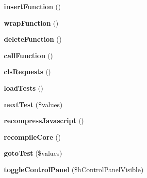 \begin{DoxyCompactItemize}
\item 
\hypertarget{classclsRequests_aefe0f19e2defb6061e760234f1917ba5}{
{\bfseries insertFunction} ()}
\label{classclsRequests_aefe0f19e2defb6061e760234f1917ba5}

\item 
\hypertarget{classclsRequests_afabd1b7dba58f75895e8fb9b5a83bf74}{
{\bfseries wrapFunction} ()}
\label{classclsRequests_afabd1b7dba58f75895e8fb9b5a83bf74}

\item 
\hypertarget{classclsRequests_ae243937177255fa0de65c9c7eba72335}{
{\bfseries deleteFunction} ()}
\label{classclsRequests_ae243937177255fa0de65c9c7eba72335}

\item 
\hypertarget{classclsRequests_a431c043ef017a22eadfe3abf18c07098}{
{\bfseries callFunction} ()}
\label{classclsRequests_a431c043ef017a22eadfe3abf18c07098}

\item 
\hypertarget{classclsRequests_abf00e5456c1624acca683a3f1584bd13}{
{\bfseries clsRequests} ()}
\label{classclsRequests_abf00e5456c1624acca683a3f1584bd13}

\item 
\hypertarget{classclsRequests_a92f4abbd473ee95778cf87dc901e8b67}{
{\bfseries loadTests} ()}
\label{classclsRequests_a92f4abbd473ee95778cf87dc901e8b67}

\item 
\hypertarget{classclsRequests_a80f55b2c0599bafb3e89c34ae862e1a2}{
{\bfseries nextTest} (\$values)}
\label{classclsRequests_a80f55b2c0599bafb3e89c34ae862e1a2}

\item 
\hypertarget{classclsRequests_acaa084d94af99c1e3bfffaef1d17bf3d}{
{\bfseries recompressJavascript} ()}
\label{classclsRequests_acaa084d94af99c1e3bfffaef1d17bf3d}

\item 
\hypertarget{classclsRequests_ac4fb35429664d8a889b98a2656a13906}{
{\bfseries recompileCore} ()}
\label{classclsRequests_ac4fb35429664d8a889b98a2656a13906}

\item 
\hypertarget{classclsRequests_a653b2eae1dca72895ec909d548f873a1}{
{\bfseries gotoTest} (\$values)}
\label{classclsRequests_a653b2eae1dca72895ec909d548f873a1}

\item 
\hypertarget{classclsRequests_a7e9dbc4e37eb66154c46283bf8448c11}{
{\bfseries toggleControlPanel} (\$bControlPanelVisible)}
\label{classclsRequests_a7e9dbc4e37eb66154c46283bf8448c11}

\end{DoxyCompactItemize}
